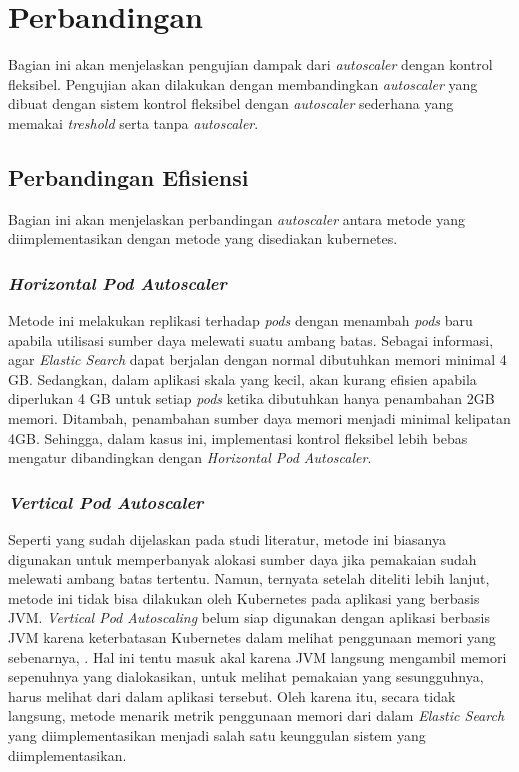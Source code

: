 \section{Perbandingan}

Bagian ini akan menjelaskan pengujian dampak dari \textit{autoscaler} dengan kontrol fleksibel. Pengujian akan dilakukan dengan membandingkan \textit{autoscaler} yang dibuat dengan sistem kontrol fleksibel dengan \textit{autoscaler} sederhana yang memakai \textit{treshold} serta tanpa \textit{autoscaler}. 


\subsection{Perbandingan Efisiensi}

Bagian ini akan menjelaskan perbandingan \textit{autoscaler} antara metode yang diimplementasikan dengan metode yang disediakan kubernetes.

\subsubsection{\textit{Horizontal Pod Autoscaler}}

Metode ini melakukan replikasi terhadap \textit{pods} dengan menambah \textit{pods} baru apabila utilisasi sumber daya melewati suatu ambang batas. Sebagai informasi, agar \textit{Elastic Search} dapat berjalan dengan normal dibutuhkan memori minimal 4 GB. Sedangkan, dalam aplikasi skala yang kecil, akan kurang efisien apabila diperlukan 4 GB untuk setiap \textit{pods} ketika dibutuhkan hanya penambahan 2GB memori. Ditambah, penambahan sumber daya memori menjadi minimal kelipatan 4GB. Sehingga, dalam kasus ini, implementasi kontrol fleksibel lebih bebas mengatur dibandingkan dengan \textit{Horizontal Pod Autoscaler}.

\subsubsection{\textit{Vertical Pod Autoscaler}}

Seperti yang sudah dijelaskan pada studi literatur, metode ini biasanya digunakan untuk memperbanyak alokasi sumber daya jika pemakaian sudah melewati ambang batas tertentu. Namun, ternyata setelah diteliti lebih lanjut, metode ini tidak bisa dilakukan oleh Kubernetes pada aplikasi yang berbasis JVM. \textit{Vertical Pod Autoscaling} belum siap digunakan dengan aplikasi berbasis JVM karena keterbatasan Kubernetes dalam melihat penggunaan memori yang sebenarnya, \parencite{googlevpajvm}. Hal ini tentu masuk akal karena JVM langsung mengambil memori sepenuhnya yang dialokasikan, untuk melihat pemakaian yang sesungguhnya, harus melihat dari dalam aplikasi tersebut. Oleh karena itu, secara tidak langsung, metode menarik metrik penggunaan memori dari dalam \textit{Elastic Search} yang diimplementasikan menjadi salah satu keunggulan sistem yang diimplementasikan.
